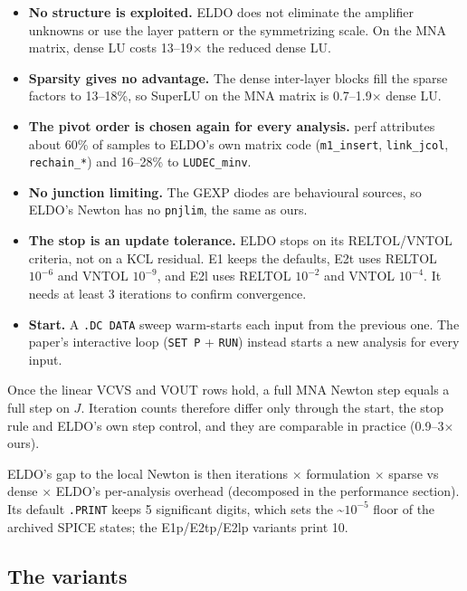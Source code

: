 \documentclass[11pt,a4paper]{article}
\begin{document}
\begin{itemize}
\item \textbf{No structure is exploited.} ELDO does not eliminate the amplifier unknowns or
use the layer pattern or the symmetrizing scale. On the MNA matrix, dense LU costs
13--19\ensuremath{\times} the reduced dense LU.
\item \textbf{Sparsity gives no advantage.} The dense inter-layer blocks fill the sparse
factors to 13--18\%, so SuperLU on the MNA matrix is 0.7--1.9\ensuremath{\times} dense
LU.
\item \textbf{The pivot order is chosen again for every analysis.} perf attributes about 60\%
of samples to ELDO's own matrix code (\nolinkurl{m1_insert}, \nolinkurl{link_jcol},
\nolinkurl{rechain_*}) and 16--28\% to \nolinkurl{LUDEC_minv}.
\item \textbf{No junction limiting.} The GEXP diodes are behavioural sources, so ELDO's Newton
has no \nolinkurl{pnjlim}, the same as ours.
\item \textbf{The stop is an update tolerance.} ELDO stops on its RELTOL/VNTOL criteria, not
on a KCL residual. E1 keeps the defaults, E2t uses RELTOL $10^{-6}$ and VNTOL $10^{-9}$,
and E2l uses RELTOL $10^{-2}$ and VNTOL $10^{-4}$. It needs at least 3 iterations to
confirm convergence.
\item \textbf{Start.} A \nolinkurl{.DC DATA} sweep warm-starts each input from the previous
one. The paper's interactive loop (\nolinkurl{SET P} + \nolinkurl{RUN}) instead starts a
new analysis for every input.
\end{itemize}

Once the linear VCVS and VOUT rows hold, a full MNA Newton step equals a full step on
$J$. Iteration counts therefore differ only through the start, the stop rule and ELDO's
own step control, and they are comparable in practice (0.9--3\ensuremath{\times} ours).

ELDO's gap to the local Newton is then iterations \ensuremath{\times} formulation
\ensuremath{\times} sparse vs dense \ensuremath{\times} ELDO's per-analysis overhead
(decomposed in the performance section). Its default \nolinkurl{.PRINT} keeps 5
significant digits, which sets the \textasciitilde{}$10^{-5}$ floor of the archived
SPICE states; the E1p/E2tp/E2lp variants print 10.

\subsection*{The variants}
\end{document}
